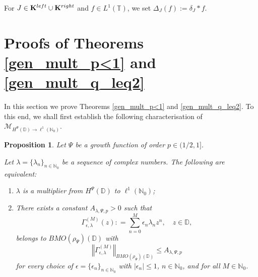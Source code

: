 \documentclass[a4paper, leqno, 10pt]{amsart}
\numberwithin{equation}{section}
\newtheorem{proposition}[thm]{Proposition}
\newcommand{\T}{\mathbb{T}}
\newcommand{\norm}[1]{\left\Vert#1\right\Vert}
\newcommand{\D}{\mathbb{D}}
\newcommand{\N}{\mathbb{N}}
\begin{document}
For $J \in \mathbf{K}^{\rm left} \cup \mathbf{K}^{\rm right}$ and $f \in L^1 (\T) $, we set $\Delta_J (f) := \delta_J \ast f$.


%
\section{Proofs of Theorems \ref{gen_mult_p<1} and \ref{gen_mult_q_leq2}}\label{firstproofsection}
%
In this section we prove Theorems \ref{gen_mult_p<1} and \ref{gen_mult_q_leq2}. 
To this end, we shall first establish the following characterisation of $\mathcal{M}_{H^{\Psi} (\D) \rightarrow \ell^1 (\N_0)}$.

\begin{proposition}\label{equiv_prop}
Let $\Psi$ be a growth function of order $p \in (1/2, 1]$.  
 
Let $\lambda = \{ \lambda_n \}_{n \in \N_0}$ be a sequence of complex numbers.
%
%
The following are equivalent:
\begin{enumerate}
\item $\lambda$ is a multiplier from $H^{\Psi} (\D)$ to $\ell^1 (\N_0)$;
\item There exists a constant $A_{\lambda, \Psi, p}>0$  such that
\[
\Gamma_{\epsilon, \lambda}^{(M)} (z) : = \sum_{n=0}^M \epsilon_n \lambda_n z^n, \quad z \in \D,
\]
belongs to $BMO (\rho_{\Psi}) (\D)$ with 
\[
\norm{\Gamma_{\epsilon, \lambda}^{(M)}}_{BMO (\rho_{\Psi}) (\D)} \leq A_{\lambda, \Psi,p} 
\]
for every choice of $\epsilon = \{ \epsilon_n \}_{n \in \N_0}$ with $| \epsilon_n | \leq 1$, $n \in \N_0$, and for all $M \in \N_0$.
\end{enumerate}
\end{proposition}
\end{document}
